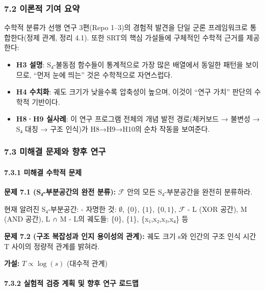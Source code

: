 \documentclass[
]{article}
\providecommand{\tightlist}{%
  \setlength{\itemsep}{0pt}\setlength{\parskip}{0pt}}
\begin{document}
\subsubsection{7.2 이론적 기여
요약}\label{uxc774uxb860uxc801-uxae30uxc5ec-uxc694uxc57d}

수학적 분류가 선행 연구 3편(Repo 1--3)의 경험적 발견을 단일 군론
프레임워크로 통합한다(정제 관계, 정리 4.1). 또한 SRT의 핵심 가설들에
구체적인 수학적 근거를 제공한다:

\begin{itemize}
\tightlist
\item
  \textbf{H3 설명}: S₄-불동점 함수들이 통계적으로 가장 많은 배열에서
  동일한 패턴을 보이므로, ``먼저 눈에 띄는'' 것은 수학적으로 자연스럽다.
\item
  \textbf{H4 수치화}: 궤도 크기가 낮을수록 압축성이 높으며, 이것이
  ``연구 가치'' 판단의 수학적 기반이다.
\item
  \textbf{H8·H9 실사례}: 이 연구 프로그램 전체의 개념 발전 경로(체커보드
  → 불변성 → S₄ 대칭 → 구조 인식)가 H8→H9→H10의 순차 작동을 보여준다.
\end{itemize}

\subsubsection{7.3 미해결 문제와 향후
연구}\label{uxbbf8uxd574uxacb0-uxbb38uxc81cuxc640-uxd5a5uxd6c4-uxc5f0uxad6c}

\paragraph{7.3.1 미해결 수학적
문제}\label{uxbbf8uxd574uxacb0-uxc218uxd559uxc801-uxbb38uxc81c}

\textbf{문제 7.1 (S₄-부분공간의 완전 분류):} \(\mathcal{F}\) 안의 모든
S₄-부분공간을 완전히 분류하라.

현재 알려진 S₄-부분공간: - 자명한 것: \(\emptyset\), \(\{0\}\),
\(\{1\}\), \(\{0, 1\}\), \(\mathcal{F}\) - L (XOR 공간), M (AND 공간), L
∩ M - L의 궤도들: \{0\}, \{1\}, \{x₁,x₂,x₃,x₄\} 등

\textbf{문제 7.2 (구조 복잡성과 인지 용이성의 관계):} 궤도 크기 s와
인간의 구조 인식 시간 T 사이의 정량적 관계를 밝혀라.

\textbf{가설:} \(T \propto \log(s)\) (대수적 관계)

\paragraph{7.3.2 실험적 검증 계획 및 향후 연구
로드맵}\label{uxc2e4uxd5d8uxc801-uxac80uxc99d-uxacc4uxd68d-uxbc0f-uxd5a5uxd6c4-uxc5f0uxad6c-uxb85cuxb4dcuxb9f5}
\end{document}
